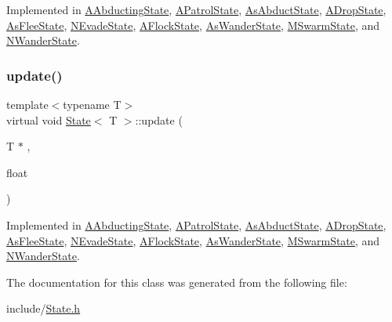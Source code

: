 Implemented in \hyperlink{class_a_abducting_state_a4a592efc0ae90b3c88de9cb676ed8357}{A\+Abducting\+State}, \hyperlink{class_a_patrol_state_ad8772aee88fa833b742c722138d33174}{A\+Patrol\+State}, \hyperlink{class_as_abduct_state_afad21e00707545b221d707932b22375e}{As\+Abduct\+State}, \hyperlink{class_a_drop_state_ab41abe3006ca9d4dec5e93a800a03e01}{A\+Drop\+State}, \hyperlink{class_as_flee_state_a73dfdf7af46e5bce0b212030413cd00c}{As\+Flee\+State}, \hyperlink{class_n_evade_state_a4df3fb4c1325d9546ff1f659086d4f38}{N\+Evade\+State}, \hyperlink{class_a_flock_state_a375255af2422bad8037325ea8ff86ddb}{A\+Flock\+State}, \hyperlink{class_as_wander_state_a7821ce2fdac9afa1b111f695ac51af43}{As\+Wander\+State}, \hyperlink{class_m_swarm_state_a16fbf13f8cb9436570eb97e829befc3e}{M\+Swarm\+State}, and \hyperlink{class_n_wander_state_a8f0f059e756935283e903fa4647a7c3d}{N\+Wander\+State}.

\mbox{\label{class_state_a30b5f87ed3e3a05fafeaf898e43518ea}} 
\subsubsection{\texorpdfstring{update()}{update()}}
{\footnotesize\ttfamily template$<$typename T$>$ \\
virtual void \hyperlink{class_state}{State}$<$ T $>$\+::update (\begin{DoxyParamCaption}\item[{T $\ast$}]{,  }\item[{float}]{ }\end{DoxyParamCaption})\hspace{0.3cm}{\ttfamily [pure virtual]}}



Implemented in \hyperlink{class_a_abducting_state_a37963b87c9c9fea8cfc8252618a53c98}{A\+Abducting\+State}, \hyperlink{class_a_patrol_state_adc21543780010bc78a157827a7e253b8}{A\+Patrol\+State}, \hyperlink{class_as_abduct_state_a5d1f94854fc9ef5e4cc35734ad691660}{As\+Abduct\+State}, \hyperlink{class_a_drop_state_a50ee2cafa31714ee14223e6cce007f08}{A\+Drop\+State}, \hyperlink{class_as_flee_state_a2a6af75f427daa36c6e480f531e783ee}{As\+Flee\+State}, \hyperlink{class_n_evade_state_a9f4c58b444e53f79c9be0ebd85bf63a2}{N\+Evade\+State}, \hyperlink{class_a_flock_state_ac452fa27fac302918460575e5badae91}{A\+Flock\+State}, \hyperlink{class_as_wander_state_ab95b3dd74d0f3109a4778fceda43221d}{As\+Wander\+State}, \hyperlink{class_m_swarm_state_a7e4abd7da613e0a3d013e149c37f8e40}{M\+Swarm\+State}, and \hyperlink{class_n_wander_state_aa6245a3229ba7f0231e4d2bad59a0789}{N\+Wander\+State}.



The documentation for this class was generated from the following file\+:\begin{DoxyCompactItemize}
\item 
include/\hyperlink{_state_8h}{State.\+h}\end{DoxyCompactItemize}
